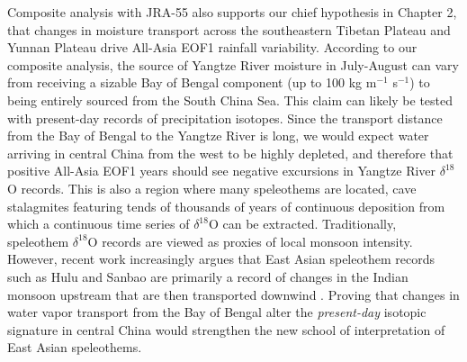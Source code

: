 	Composite analysis with JRA-55 also supports our chief hypothesis in Chapter 2, that changes in moisture transport across the southeastern Tibetan Plateau and Yunnan Plateau drive All-Asia EOF1 rainfall variability. According to our composite analysis, the source of Yangtze River moisture in July-August can vary from receiving a sizable Bay of Bengal component (up to 100 kg m$^{-1}$ s$^{-1}$) to being entirely sourced from the South China Sea. This claim can likely be tested with present-day records of precipitation isotopes. Since the transport distance from the Bay of Bengal to the Yangtze River is long, we would expect water arriving in central China from the west to be highly depleted, and therefore that positive All-Asia EOF1 years should see negative excursions in Yangtze River $\delta ^{18}$O records. This is also a region where many speleothems are located, cave stalagmites featuring tends of thousands of years of continuous deposition from which a continuous time series of $\delta ^{18}$O can be extracted. Traditionally, speleothem $\delta ^{18}$O records are viewed as proxies of local monsoon intensity. However, recent work increasingly argues that East Asian speleothem records such as Hulu and Sanbao are primarily a record of changes in the Indian monsoon upstream that are then transported downwind \citep{Pausata2011,Cai2015,Baker2015}. Proving that changes in water vapor transport from the Bay of Bengal alter the \textit{present-day} isotopic signature in central China would strengthen the new school of interpretation of East Asian speleothems.

